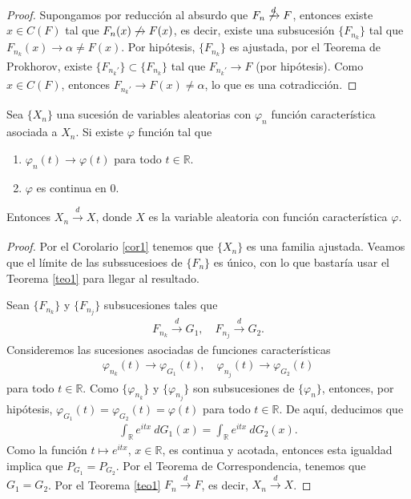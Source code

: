 \begin{proof}
    Supongamos por reducción al absurdo que $F_n \not \xrightarrow[]{d} F$, entonces existe $x \in C(F)$ tal que $F_n(x) \not \xrightarrow[]{} F(x)$, es decir, existe una subsucesión $\{F_{n_k}\}$ tal que $F_{n_k}(x) \xrightarrow[]{} \alpha \not = F(x)$. Por hipótesis, $\{F_{n_k}\}$ es ajustada, por el Teorema de Prokhorov, existe $\{F_{n_k'}\} \subset \{F_{n_k}\}$ tal que $F_{n_k'} \xrightarrow[]{} F$ (por hipótesis). Como $x \in C(F)$, entonces $F_{n_k'} \xrightarrow[]{} F(x) \not = \alpha$, lo que es una cotradicción.
\end{proof}

\begin{teo}
    Sea $\{X_n\}$ una sucesión de variables aleatorias con $\varphi_n$ función característica asociada a $X_n$. Si existe $\varphi$ función tal que
    \begin{enumerate}
        \item $\varphi_n(t) \longrightarrow \varphi(t)$ para todo $t \in \mathbb{R}$.
        \item $\varphi$ es continua en $0$.
    \end{enumerate}
    Entonces $X_n \xrightarrow[]{d} X$, donde $X$ es la variable aleatoria con función característica $\varphi$.
\end{teo}

\begin{proof}
    Por el Corolario \ref{cor1} tenemos que $\{X_n\}$ es una familia ajustada. Veamos que el límite de las subssucesioes de $\{F_n\}$ es único, con lo que bastaría usar el Teorema \ref{teo1} para llegar al resultado.

    Sean $\{F_{n_k}\}$ y $\{F_{n_j}\}$ subsucesiones tales que
    \begin{align*}
        F_{n_k} \xrightarrow[]{d} G_1, \quad F_{n_j} \xrightarrow[]{d} G_2.
    \end{align*}
    Consideremos las sucesiones asociadas de funciones características
    \begin{align*}
        \varphi_{n_k}(t) \longrightarrow \varphi_{G_1}(t), \quad \varphi_{n_j}(t) \longrightarrow \varphi_{G_2}(t)
    \end{align*}
    para todo $t \in \mathbb{R}$. Como $\{\varphi_{n_k}\}$ y $\{\varphi_{n_j}\}$ son subsucesiones de $\{\varphi_n\}$, entonces, por hipótesis, $\varphi_{G_1}(t) = \varphi_{G_2}(t) = \varphi(t)$ para todo $t \in \mathbb{R}$. De aquí, deducimos que
    \begin{align*}
        \int_{\mathbb{R}} e^{itx} \ dG_1(x) = \int_{\mathbb{R}} e^{itx} \ dG_2(x).
    \end{align*}
    Como la función $t \longmapsto e^{itx}$, $x \in \mathbb{R}$, es continua y acotada, entonces esta igualdad implica que $P_{G_1} = P_{G_2}$. Por el Teorema de Correspondencia, tenemos que $G_1 = G_2$. Por  el Teorema \ref{teo1} $F_n \xrightarrow[]{d} F$, es decir, $X_n \xrightarrow[]{d} X$.
\end{proof}

